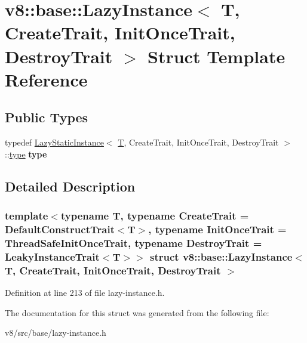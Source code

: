 \hypertarget{structv8_1_1base_1_1LazyInstance}{}\section{v8\+:\+:base\+:\+:Lazy\+Instance$<$ T, Create\+Trait, Init\+Once\+Trait, Destroy\+Trait $>$ Struct Template Reference}
\label{structv8_1_1base_1_1LazyInstance}
\subsection*{Public Types}
\begin{DoxyCompactItemize}
\item 
\mbox{\label{structv8_1_1base_1_1LazyInstance_a91c6b8e8682989eb6b86fd3b6cb5328e}} 
typedef \mbox{\hyperlink{structv8_1_1base_1_1LazyStaticInstance}{Lazy\+Static\+Instance}}$<$ \mbox{\hyperlink{classv8_1_1internal_1_1torque_1_1T}{T}}, Create\+Trait, Init\+Once\+Trait, Destroy\+Trait $>$\+::\mbox{\hyperlink{structv8_1_1base_1_1LazyInstanceImpl}{type}} {\bfseries type}
\end{DoxyCompactItemize}


\subsection{Detailed Description}
\subsubsection*{template$<$typename T, typename Create\+Trait = Default\+Construct\+Trait$<$\+T$>$, typename Init\+Once\+Trait = Thread\+Safe\+Init\+Once\+Trait, typename Destroy\+Trait = Leaky\+Instance\+Trait$<$\+T$>$$>$\newline
struct v8\+::base\+::\+Lazy\+Instance$<$ T, Create\+Trait, Init\+Once\+Trait, Destroy\+Trait $>$}



Definition at line 213 of file lazy-\/instance.\+h.



The documentation for this struct was generated from the following file\+:\begin{DoxyCompactItemize}
\item 
v8/src/base/lazy-\/instance.\+h\end{DoxyCompactItemize}

